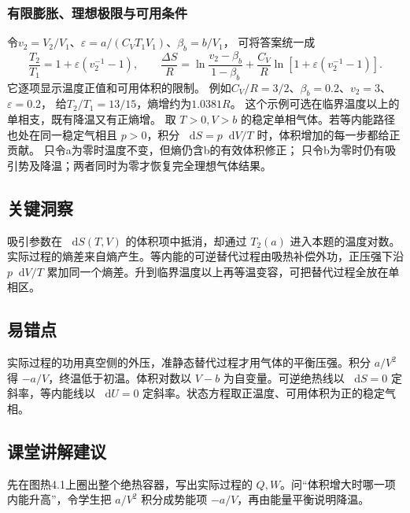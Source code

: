 \documentclass[UTF8,fontset=fandol,a4paper,11pt]{ctexart}
\newcommand{\dd}{\mathop{}\!\mathrm{d}}
\begin{document}
\subsubsection*{有限膨胀、理想极限与可用条件}
令$v_2=V_2/V_1$、$\varepsilon=a/(C_VT_1V_1)$、$\beta_b=b/V_1$，
可将答案统一成
\[
\frac{T_2}{T_1}=1+\varepsilon(v_2^{-1}-1),\qquad
\frac{\Delta S}{R}
=\ln\frac{v_2-\beta_b}{1-\beta_b}
+\frac{C_V}{R}\ln[1+\varepsilon(v_2^{-1}-1)].
\]
它逐项显示温度正值和可用体积的限制。
例如$C_V/R=3/2$、$\beta_b=0.2$、$v_2=3$、$\varepsilon=0.2$，
给$T_2/T_1=13/15$，熵增约为$1.0381R$。
这个示例可选在临界温度以上的单相支，既有降温又有正熵增。
取 $T>0,V>b$ 的稳定单相气体。若等内能路径也处在同一稳定气相且 $p>0$，积分 $\dd S=p\dd V/T$ 时，体积增加的每一步都给正贡献。
只令a为零时温度不变，但熵仍含b的有效体积修正；
只令b为零时仍有吸引势及降温；两者同时为零才恢复完全理想气体结果。




\subsection*{关键洞察}

吸引参数在 $\dd S(T,V)$ 的体积项中抵消，却通过 $T_2(a)$ 进入本题的温度对数。实际过程的熵差来自熵产生。等内能的可逆替代过程由吸热补偿外功，正压强下沿 $p\dd V/T$ 累加同一个熵差。升到临界温度以上再等温变容，可把替代过程全放在单相区。



\subsection*{易错点}

实际过程的功用真空侧的外压，准静态替代过程才用气体的平衡压强。积分 $a/V^2$ 得 $-a/V$，终温低于初温。体积对数以 $V-b$ 为自变量。可逆绝热线以 $\dd S=0$ 定斜率，等内能线以 $\dd U=0$ 定斜率。状态方程取正温度、可用体积为正的稳定气相。



\subsection*{课堂讲解建议}

先在图热4.1上圈出整个绝热容器，写出实际过程的 $Q,W$。问“体积增大时哪一项内能升高”，令学生把 $a/V^2$ 积分成势能项 $-a/V$，再由能量平衡说明降温。
\end{document}
